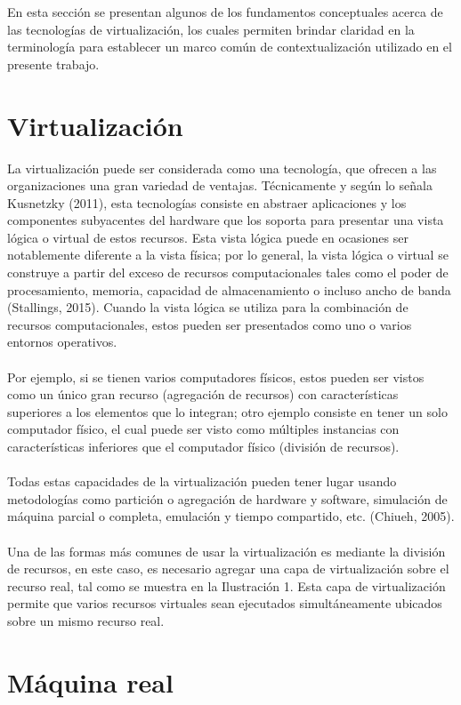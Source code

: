 En esta sección se presentan algunos de los fundamentos conceptuales acerca de las tecnologías de virtualización, los cuales permiten brindar claridad en la terminología para establecer un marco común de contextualización utilizado en el presente trabajo. 

\section{Virtualización}

La virtualización puede ser considerada como una tecnología, que ofrecen a las organizaciones una gran variedad de ventajas. Técnicamente y según lo señala Kusnetzky (2011), esta tecnologías consiste en abstraer aplicaciones y los componentes subyacentes del hardware que los soporta para presentar una vista lógica o virtual de estos recursos. Esta vista lógica puede en ocasiones ser notablemente diferente a la vista física; por lo general, la vista lógica o virtual se construye a partir del exceso de recursos computacionales tales como el poder de procesamiento, memoria, capacidad de almacenamiento o incluso ancho de banda (Stallings, 2015). Cuando la vista lógica se utiliza para la combinación de recursos computacionales, estos pueden ser presentados como uno o varios entornos operativos. 
\\\\
Por ejemplo, si se tienen varios computadores físicos, estos pueden ser vistos como un único gran recurso (agregación de recursos) con características superiores a los elementos que lo integran; otro ejemplo consiste en tener un solo computador físico, el cual puede ser visto como múltiples instancias con características inferiores que el computador físico (división de recursos). 
\\\\
Todas estas capacidades de la virtualización pueden tener lugar usando metodologías como partición o agregación de hardware y software, simulación de máquina parcial o completa, emulación y tiempo compartido, etc.  (Chiueh, 2005).
\\\\
Una de las formas más comunes de usar la virtualización es mediante la división de recursos, en este caso, es necesario agregar una capa de virtualización sobre el recurso real, tal como se muestra en la Ilustración 1. Esta capa de virtualización permite que varios recursos virtuales sean ejecutados simultáneamente ubicados sobre un mismo recurso real.


\section{Máquina real}

